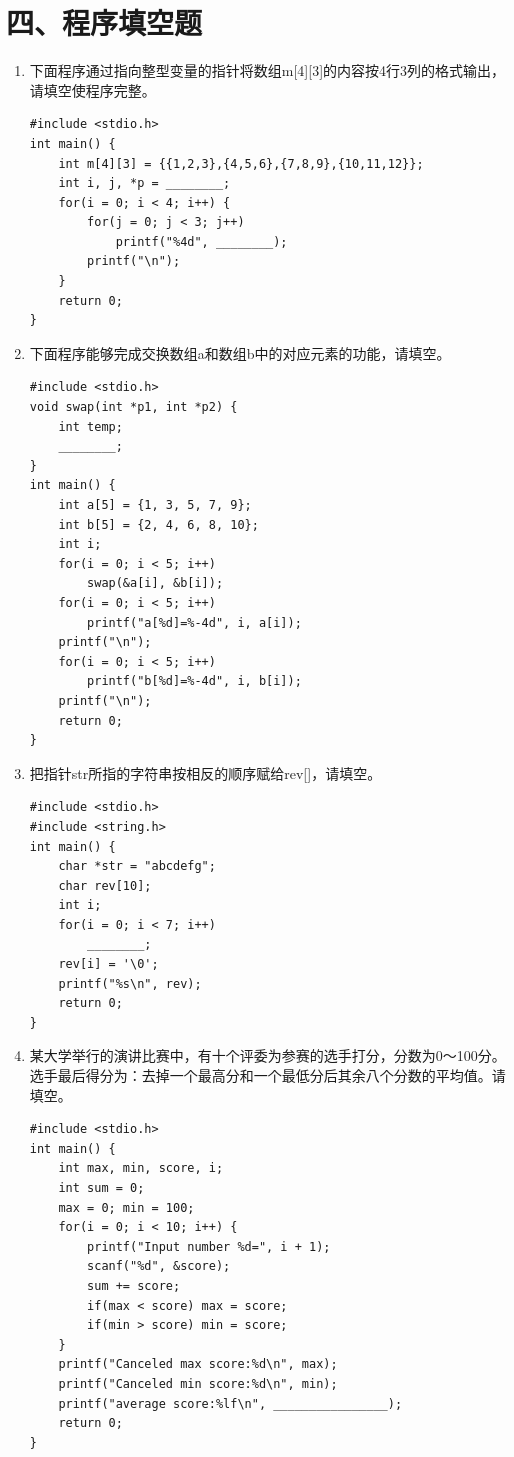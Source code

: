\documentclass[a4paper,12pt]{article}
\begin{document}
\section*{四、程序填空题}

\begin{enumerate}
	\item 下面程序通过指向整型变量的指针将数组m[4][3]的内容按4行3列的格式输出，请填空使程序完整。
	      \begin{verbatim}
#include <stdio.h>
int main() {
    int m[4][3] = {{1,2,3},{4,5,6},{7,8,9},{10,11,12}};
    int i, j, *p = ________;
    for(i = 0; i < 4; i++) {
        for(j = 0; j < 3; j++) 
            printf("%4d", ________);
        printf("\n");
    }
    return 0;
}
    \end{verbatim}
	      \vspace{0.3cm}

	\item 下面程序能够完成交换数组a和数组b中的对应元素的功能，请填空。
	      \begin{verbatim}
#include <stdio.h>
void swap(int *p1, int *p2) {
    int temp;
    ________;
}
int main() {
    int a[5] = {1, 3, 5, 7, 9};
    int b[5] = {2, 4, 6, 8, 10};
    int i;
    for(i = 0; i < 5; i++) 
        swap(&a[i], &b[i]);
    for(i = 0; i < 5; i++) 
        printf("a[%d]=%-4d", i, a[i]);
    printf("\n");
    for(i = 0; i < 5; i++) 
        printf("b[%d]=%-4d", i, b[i]);
    printf("\n");
    return 0;
}
    \end{verbatim}
	      \vspace{0.3cm}

	\item 把指针str所指的字符串按相反的顺序赋给rev[]，请填空。
	      \begin{verbatim}
#include <stdio.h>
#include <string.h>
int main() {
    char *str = "abcdefg";
    char rev[10];
    int i;
    for(i = 0; i < 7; i++) 
        ________;
    rev[i] = '\0';
    printf("%s\n", rev);
    return 0;
}
    \end{verbatim}
	      \vspace{0.3cm}

	\item 某大学举行的演讲比赛中，有十个评委为参赛的选手打分，分数为0～100分。选手最后得分为：去掉一个最高分和一个最低分后其余八个分数的平均值。请填空。
	      \begin{verbatim}
#include <stdio.h>
int main() {
    int max, min, score, i;
    int sum = 0;
    max = 0; min = 100;
    for(i = 0; i < 10; i++) {
        printf("Input number %d=", i + 1);
        scanf("%d", &score);
        sum += score;
        if(max < score) max = score;
        if(min > score) min = score;
    }
    printf("Canceled max score:%d\n", max);
    printf("Canceled min score:%d\n", min);
    printf("average score:%lf\n", ________________);
    return 0;
}
    \end{verbatim}
	      \vspace{0.3cm}


\end{enumerate}
\end{document}
